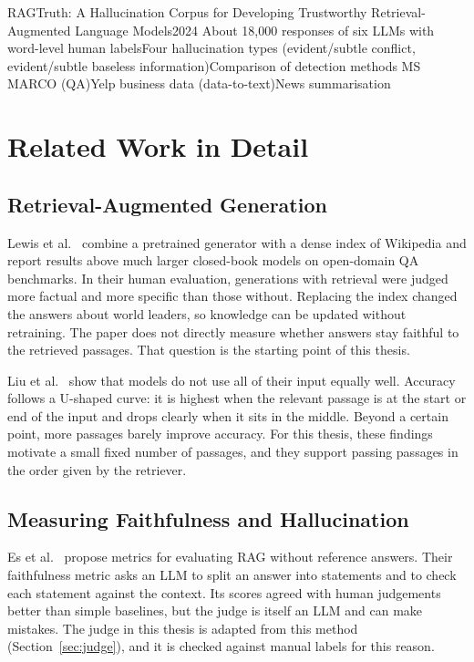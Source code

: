   {RAGTruth: A Hallucination Corpus for Developing Trustworthy Retrieval-Augmented Language
   Models}{2024}
  {About 18,000 responses of six LLMs with word-level human labels\newline Four hallucination
   types (evident/subtle conflict, evident/subtle baseless information)\newline Comparison of
   detection methods}
  {MS MARCO (QA)\newline Yelp business data (data-to-text)\newline News summarisation}

\section{Related Work in Detail}

\subsection{Retrieval-Augmented Generation}
Lewis et al.\ \cite{lewis2020rag} combine a pretrained generator with a dense index of Wikipedia
and report results above much larger closed-book models on open-domain QA benchmarks. In their
human evaluation, generations with retrieval were judged more factual and more specific than
those without. Replacing the index changed the answers about world leaders, so knowledge can be
updated without retraining. The paper does not directly measure whether answers stay faithful to
the retrieved passages. That question is the starting point of this thesis.

Liu et al.\ \cite{liu2024lost} show that models do not use all of their input equally well.
Accuracy follows a U-shaped curve: it is highest when the relevant passage is at the start or end
of the input and drops clearly when it sits in the middle. Beyond a certain point, more passages
barely improve accuracy. For this thesis, these findings motivate a small fixed number of
passages, and they support passing passages in the order given by the retriever.

\subsection{Measuring Faithfulness and Hallucination}
Es et al.\ \cite{es2024ragas} propose metrics for evaluating RAG without reference answers. Their
faithfulness metric asks an LLM to split an answer into statements and to check each statement
against the context. Its scores agreed with human judgements better than simple baselines, but the
judge is itself an LLM and can make mistakes. The judge in this thesis is adapted from this method
(Section~\ref{sec:judge}), and it is checked against manual labels for this reason.

